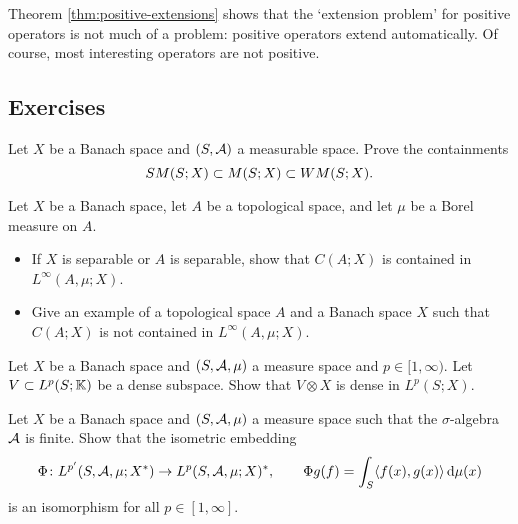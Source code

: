 Theorem \ref{thm:positive-extensions} shows that the `extension problem' for positive operators is not much of a problem: positive operators extend automatically.
Of course, most interesting operators are not positive.

\begin{example}
\end{example}



\subsection*{Exercises}

\begin{exercise}\label{ex:measurability-containments}
  Let $X$ be a Banach space and $(S,\mathcal{A})$ a measurable space.
  Prove the containments
  \begin{equation*}
    SM(S;X) \subset M(S;X) \subset WM(S;X).
  \end{equation*}
\end{exercise}

\begin{exercise}
  Let $X$ be a Banach space, let $A$ be a topological space, and let $\mu$ be a Borel measure on $A$.
  \begin{itemize}
  \item If $X$ is separable or $A$ is separable, show that $C(A;X)$ is contained in $L^\infty(A, \mu;X)$.
  \item Give an example of a topological space $A$ and a Banach space $X$ such that $C(A;X)$ is not contained in $L^\infty(A,\mu;X)$.
  \end{itemize}
\end{exercise}

\begin{exercise}\label{ex:general-density}
  Let $X$ be a Banach space and $(S,\mathcal{A},\mu)$ a measure space and $p \in [1,\infty)$.
  Let $V \subset L^p(S;\mathbb{K})$ be a dense subspace.
  Show that $V \otimes X$ is dense in $L^p(S;X)$.
\end{exercise}

\begin{exercise}\label{ex:finite-sigma-alg-duality}
  Let $X$ be a Banach space and $(S,\mathcal{A},\mu)$ a measure space such that the $\sigma$-algebra $\mathcal{A}$ is finite.
  Show that the isometric embedding
  \begin{equation*}
    \Phi \colon L^{p'}(S,\mathcal{A},\mu;X^*) \rightarrow L^p(S,\mathcal{A},\mu;X)^*, \qquad \Phi g(f) = \int_S \langle f(x), g(x) \rangle \, \mathrm{d}\mu(x)
  \end{equation*}
  is an isomorphism for all $p \in [1,\infty]$.
\end{exercise}

